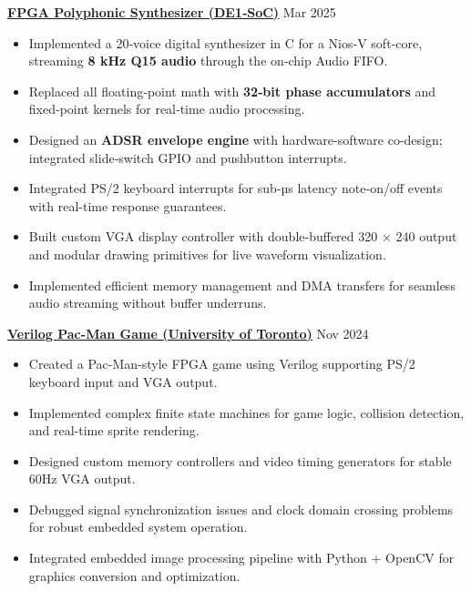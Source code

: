\documentclass[letterpaper,10pt]{article}
\begin{document}
\noindent\href{https://github.com/alexzjm/ece243-sound-synthesizer}{\uline{
\textbf{FPGA Polyphonic Synthesizer (DE1‑SoC)}}} \hfill Mar 2025
\begin{itemize}[leftmargin=0.2in]
    \item Implemented a 20‑voice digital synthesizer in C for a Nios‑V soft‑core, streaming \textbf{8 kHz Q15 audio} through the on‑chip Audio FIFO.  
    \item Replaced all floating‑point math with \textbf{32‑bit phase accumulators} and fixed‑point kernels for real‑time audio processing.  
    \item Designed an \textbf{ADSR envelope engine} with hardware-software co-design; integrated slide‑switch GPIO and pushbutton interrupts.
    \item Integrated PS/2 keyboard interrupts for sub‑µs latency note‑on/off events with real-time response guarantees.
    \item Built custom VGA display controller with double‑buffered 320 × 240 output and modular drawing primitives for live waveform visualization.
    \item Implemented efficient memory management and DMA transfers for seamless audio streaming without buffer underruns.
\end{itemize}

\vspace{0.2cm}
\noindent\href{https://github.com/Ken-2511/ECE241-Project}{\uline{
\textbf{Verilog Pac-Man Game (University of Toronto)}}} \hfill Nov 2024
\begin{itemize}[leftmargin=0.2in]
    \item Created a Pac-Man-style FPGA game using Verilog supporting PS/2 keyboard input and VGA output.
    \item Implemented complex finite state machines for game logic, collision detection, and real-time sprite rendering.
    \item Designed custom memory controllers and video timing generators for stable 60Hz VGA output.
    \item Debugged signal synchronization issues and clock domain crossing problems for robust embedded system operation.
    \item Integrated embedded image processing pipeline with Python + OpenCV for graphics conversion and optimization.
\end{itemize}
\end{document}
